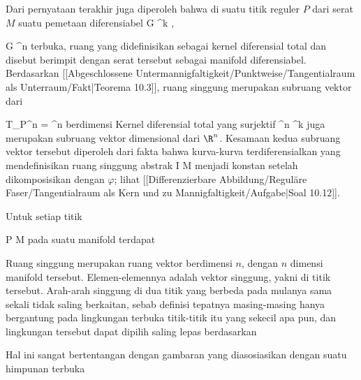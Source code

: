 Dari pernyataan terakhir juga diperoleh bahwa di suatu titik reguler $P$ dari serat $M$ suatu pemetaan diferensiabel
\maabb {\varphi} {G} {\R^k
} {,}

\mavergleichskette
{\vergleichskette
{G
}
{ \subseteq }{ \R^n
}
{  }{
}
{    }{
}
{   }{
}
}
{}{}{}
terbuka, ruang yang didefinisikan sebagai kernel diferensial total
 {} {}
dan disebut
berimpit dengan
serat tersebut sebagai manifold diferensiabel. Berdasarkan
[[Abgeschlossene Untermannigfaltigkeit/Punktweise/Tangentialraum als Unterraum/Fakt|Teorema 10.3]],
ruang singgung
 {} {}
 merupakan subruang vektor dari

\mavergleichskette
{\vergleichskette
{ T_P\R^n
}
{ = }{ \R^n
}
{  }{
}
{    }{
}
{   }{
}
}
{}{}{}
berdimensi
Kernel diferensial total yang surjektif
 { \R^n } { \R^k
} {}
juga merupakan subruang vektor
dimensional dari $\R^n$. Kesamaan kedua subruang vektor tersebut diperoleh dari fakta bahwa kurva-kurva terdiferensialkan yang mendefinisikan ruang singgung abstrak
\maabbdisp {\gamma} {I} {M
} {}
menjadi konstan setelah dikomposisikan dengan $\varphi$; lihat
[[Differenzierbare Abbildung/Reguläre Faser/Tangentialraum als Kern und zu Mannigfaltigkeit/Aufgabe|Soal 10.12]].


Untuk setiap titik

\mavergleichskette
{\vergleichskette
{ P
}
{ \in }{ M
}
{  }{
}
{    }{
}
{   }{
}
}
{}{}{}
pada suatu manifold terdapat

Ruang singgung merupakan ruang vektor berdimensi $n$, dengan $n$ dimensi manifold tersebut. Elemen-elemennya adalah vektor singgung, yakni  di titik tersebut. Arah-arah singgung di dua titik yang berbeda pada mulanya sama sekali tidak saling berkaitan, sebab definisi tepatnya masing-masing hanya bergantung pada lingkungan terbuka titik-titik itu yang sekecil apa pun, dan lingkungan tersebut dapat dipilih saling lepas berdasarkan

Hal ini sangat bertentangan dengan gambaran yang diasosiasikan dengan suatu himpunan terbuka

